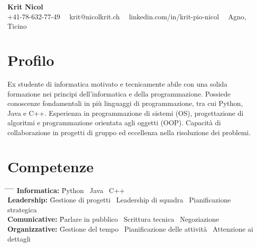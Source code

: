 \documentclass[a4paper,11pt]{article}  %
\begin{document}
\begin{center}
    {\fontsize{18pt}{22pt}\selectfont \textbf{Krit Nicol}} \\
    \vspace{0.2in}
    +41-78-632-77-49 \, \textbullet \, krit@nicolkrit.ch \, \textbullet \, linkedin.com/in/krit-pio-nicol \, \textbullet \, Agno, Ticino \\
\end{center}

\vspace{0.2in}

\section*{Profilo}
Ex studente di informatica motivato e tecnicamente abile con una solida formazione nei principi dell'informatica e della programmazione. 
Possiede conoscenze fondamentali in più linguaggi di programmazione, tra cui Python, Java e C++. 
Esperienza in programmazione di sistemi (OS), progettazione di algoritmi e programmazione orientata agli oggetti (OOP). 
Capacità di collaborazione in progetti di gruppo ed eccellenza nella risoluzione dei problemi. 
\vspace{0.2in}

\section*{Competenze}
\begin{tabbing}
    \hspace{1in} \= \hspace{1in} \= \hspace{1in} \= \hspace{1in} \= \kill
    \textbf{Informatica:} \= Python \textbullet \, Java \textbullet \, C++ \\
    \textbf{Leadership:} \= Gestione di progetti \textbullet \, Leadership di squadra \textbullet \, Pianificazione strategica \\
    \textbf{Comunicative:} \= Parlare in pubblico \textbullet \, Scrittura tecnica \textbullet \, Negoziazione \\
    \textbf{Organizzative:} \= Gestione del tempo \textbullet \, Pianificazione delle attività \textbullet \, Attenzione ai dettagli \\
\end{tabbing}
\end{document}
